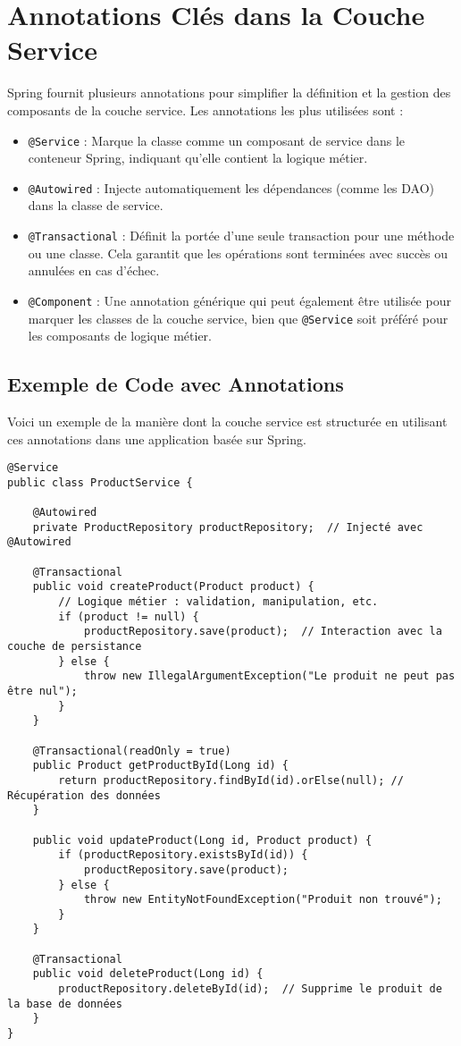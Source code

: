 \documentclass{article}
\begin{document}
\section{Annotations Clés dans la Couche Service}
Spring fournit plusieurs annotations pour simplifier la définition et la gestion des composants de la couche service. Les annotations les plus utilisées sont :

\begin{itemize}
    \item \texttt{@Service} : Marque la classe comme un composant de service dans le conteneur Spring, indiquant qu'elle contient la logique métier.
    \item \texttt{@Autowired} : Injecte automatiquement les dépendances (comme les DAO) dans la classe de service.
    \item \texttt{@Transactional} : Définit la portée d'une seule transaction pour une méthode ou une classe. Cela garantit que les opérations sont terminées avec succès ou annulées en cas d'échec.
    \item \texttt{@Component} : Une annotation générique qui peut également être utilisée pour marquer les classes de la couche service, bien que \texttt{@Service} soit préféré pour les composants de logique métier.
\end{itemize}

\subsection{Exemple de Code avec Annotations}
Voici un exemple de la manière dont la couche service est structurée en utilisant ces annotations dans une application basée sur Spring.

\begin{lstlisting}[caption={Exemple de Couche Service avec Annotations}]
@Service
public class ProductService {

    @Autowired
    private ProductRepository productRepository;  // Injecté avec @Autowired

    @Transactional
    public void createProduct(Product product) {
        // Logique métier : validation, manipulation, etc.
        if (product != null) {
            productRepository.save(product);  // Interaction avec la couche de persistance
        } else {
            throw new IllegalArgumentException("Le produit ne peut pas être nul");
        }
    }

    @Transactional(readOnly = true)
    public Product getProductById(Long id) {
        return productRepository.findById(id).orElse(null); // Récupération des données
    }

    public void updateProduct(Long id, Product product) {
        if (productRepository.existsById(id)) {
            productRepository.save(product);
        } else {
            throw new EntityNotFoundException("Produit non trouvé");
        }
    }

    @Transactional
    public void deleteProduct(Long id) {
        productRepository.deleteById(id);  // Supprime le produit de la base de données
    }
}
\end{lstlisting}
\end{document}
